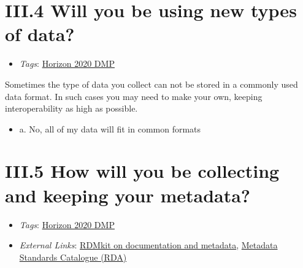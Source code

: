 \documentclass[a4paper,12pt]{report}
\begin{document}
\section*{\protect\textcolor{colorSecId}{III.4} Will you be using new types of data?}

\label{b1df3c74-0b1f-4574-81c4-4cc2d780c1af.5ba53879-eb48-47f2-a73b-f7f7d83bf030}


\begin{itemize}
  \item \textit{Tags}: \ul{Horizon 2020 DMP}
  \end{itemize}


\noindent
\begin{markdown}
Sometimes the type of data you collect can not be stored in a commonly used data format. In such cases you may need to make your own, keeping interoperability as high as possible.
\end{markdown}



\begin{itemize}
  \item[\CheckmarkBold] a. No, all of my data will fit in common formats
\end{itemize}






\section*{\protect\textcolor{colorSecId}{III.5} How will you be collecting and keeping your metadata?}

\label{b1df3c74-0b1f-4574-81c4-4cc2d780c1af.8c962e6f-17ee-4b22-8ebb-9f06f779e3b3}


\begin{itemize}
  \item \textit{Tags}: \ul{Horizon 2020 DMP}
  
  \item \textit{External Links}: \href{https://rdmkit.elixir-europe.org/metadata_management.html}{RDMkit on documentation and metadata}, \href{https://rdamsc.bath.ac.uk/}{Metadata Standards Catalogue (RDA)}\end{itemize}
\end{document}
